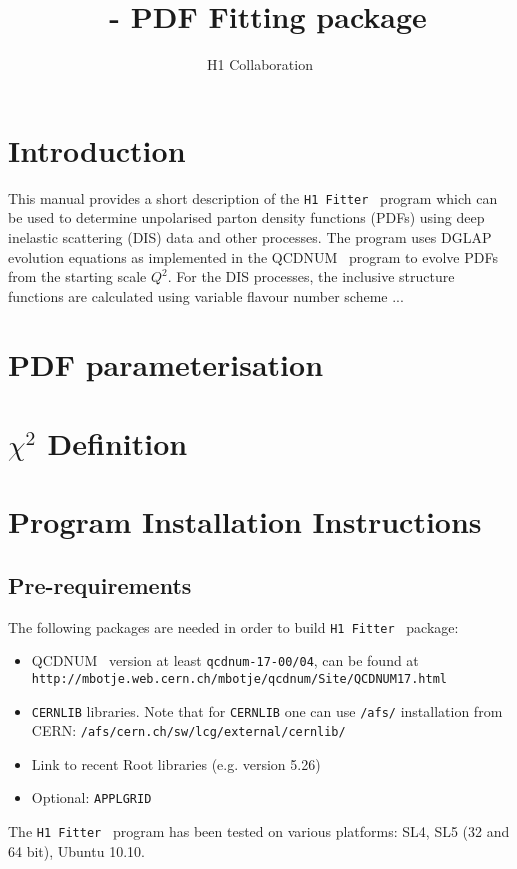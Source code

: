 \documentclass[11pt,a4paper]{article}
\title{\fitter\ - PDF Fitting package}
\author{H1 Collaboration}
\newcommand\fitter{ \mbox{\tt H1 Fitter} }
\begin{document}
\maketitle
\begin{abstract}
\end{abstract}
\tableofcontents
\section{Introduction}
This manual provides a short description of the \fitter\ program which can be used to determine unpolarised parton density functions (PDFs) using deep inelastic
scattering (DIS) data and other processes. The program uses DGLAP~\cite{Gribov:1972ri,Gribov:1972rt,Lipatov:1974qm,Dokshitzer:1977sg,Altarelli:1977zs}
 evolution 
equations as implemented in the QCDNUM~\cite{qcdnum} program to evolve PDFs
from the starting scale $Q^2$.  For the DIS processes, the inclusive structure
functions are calculated using variable flavour number scheme ...
\section{PDF parameterisation}
\section{$\chi^2$ Definition}
\section{Program Installation Instructions} 
\subsection{Pre-requirements}

The following packages are needed in order to build \fitter\ package:
\begin{itemize}
\item QCDNUM~\cite{qcdnum} version at least {\tt qcdnum-17-00/04}, can be found at \\
  {\tt http://mbotje.web.cern.ch/mbotje/qcdnum/Site/QCDNUM17.html}
\item {\tt CERNLIB} libraries. Note that for {\tt CERNLIB} one can use {\tt /afs/} installation from CERN:
  {\tt /afs/cern.ch/sw/lcg/external/cernlib/}
\item Link to recent Root libraries (e.g. version 5.26)
\item Optional: {\tt APPLGRID}
\end{itemize}
The \fitter\ program has been tested on various platforms: 
   SL4, SL5 (32 and 64 bit),  Ubuntu 10.10.
\end{document}
